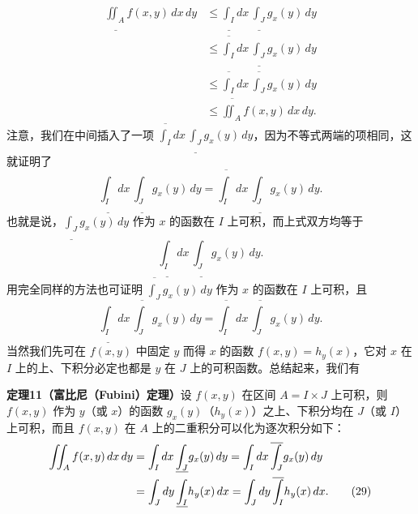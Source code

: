 \begin{align*}
 \underline{\iint_A}f(x,y)\,dx\,dy
 &\le\underline{\int_I}dx\,\underline{\int_J}g_x(y)\,dy\\
 &\le\overline{\int_I}dx\,\underline{\int_J}g_x(y)\,dy\\
 &\le\overline{\int_I}dx\,\overline{\int_J}g_x(y)\,dy\\
 &\le\overline{\iint_A}f(x,y)\,dx\,dy.
\end{align*}
注意，我们在中间插入了一项 $\overline{\int_I}dx\,\underline{\int_J}g_x(y)\,dy$，因为不等式两端的项相同，这就证明了
\[
 \underline{\int_I}dx\,\underline{\int_J}g_x(y)\,dy
 =\overline{\int_I}dx\,\underline{\int_J}g_x(y)\,dy.
\]
也就是说，$\underline{\int_J}g_x(y)\,dy$ 作为 $x$ 的函数在 $I$ 上可积，而上式双方均等于\[\underline{\int_I}dx\,\underline{\int_J}g_x(y)\,dy.\]用完全同样的方法也可证明 $\overline{\int_J}g_x(y)\,dy$ 作为 $x$ 的函数在 $I$ 上可积，且
\[
 \underline{\int_I}dx\,\overline{\int_J}g_x(y)\,dy
 =\overline{\int_I}dx\,\overline{\int_J}g_x(y)\,dy.
\]
当然我们先可在 $f(x,y)$ 中固定 $y$ 而得 $x$ 的函数 $f(x,y)=h_y(x)$，它对 $x$ 在 $I$ 上的上、下积分必定也都是 $y$ 在 $J$ 上的可积函数。总结起来，我们有

\noindent\textbf{定理11（富比尼（Fubini）定理）}\quad 设 $f(x,y)$ 在区间 $A=I\times J$ 上可积，则 $f(x,y)$ 作为 $y$（或 $x$）的函数 $g_x(y)$（$h_y(x)$）之上、下积分均在 $J$（或 $I$）上可积，而且 $f(x,y)$ 在 $A$ 上的二重积分可以化为逐次积分如下：
\begin{align}
 \iint_A f(x,y)\,dx\,dy
 &=\int_I dx\,\underline{\int_J}g_x(y)\,dy
 =\int_I dx\,\overline{\int_J}g_x(y)\,dy \notag\\
 &=\int_J dy\,\underline{\int_I}h_y(x)\,dx
 =\int_J dy\,\overline{\int_I}h_y(x)\,dx.
 \tag{29}
\end{align}

